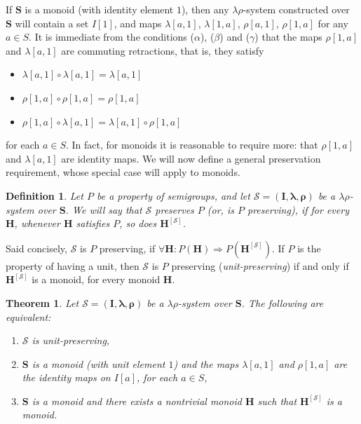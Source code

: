 \documentclass{amsart}
\newtheorem{theorem}{Theorem}
\newtheorem{definition}{Definition}
\newcommand{\blambda}{\boldsymbol{\lambda}}
\newcommand{\brho}{\boldsymbol{\rho}}
\begin{document}
If $\mathbf{S}$ is a monoid (with identity element $1$),
then any $\lambda\rho$-system
constructed over $\mathbf{S}$ will contain a set $I[1]$, and maps 
$\lambda[a,1]$, $\lambda[1,a]$, $\rho[a,1]$, $\rho[1,a]$ for any $a\in S$.
It is immediate from the conditions
($\alpha$), ($\beta$) and ($\gamma$) that 
the maps $\rho[1,a]$ and $\lambda[a,1]$ are
commuting retractions, that is, they satisfy
\begin{itemize}  
\item $\lambda[a,1]\circ\lambda[a,1] = \lambda[a,1]$
\item $\rho[1,a]\circ\rho[1,a] = \rho[1,a]$
\item $\rho[1,a]\circ\lambda[a,1]  =  \lambda[a,1]\circ\rho[1,a]$
\end{itemize}
for each $a\in S$. In fact, for monoids it is 
reasonable to require more: that $\rho[1,a]$ and $\lambda[a,1]$ are identity maps.
We will now define a general preservation 
requirement, whose special case will apply to monoids. 

\begin{definition}\label{P-preserving}
Let $P$ be a property of semigroups, and let
$\mathcal{S} = (\mathbf{I},\blambda,\brho)$ be a $\lambda\rho$-system
over $\mathbf{S}$. 
We will say that $\mathcal{S}$ \emph{preserves} $P$
\textup{(}or, \emph{is $P$ preserving}\textup{)}, if 
for every $\mathbf{H}$, whenever $\mathbf{H}$ satisfies $P$,
so does $\mathbf{H}^{[\mathcal{S}]}$. 
\end{definition}  

Said concisely, $\mathcal{S}$ is $P$ preserving, if
$\forall\mathbf{H}\colon P(\mathbf{H})\Rightarrow P(\mathbf{H}^{[\mathcal{S}]})$.
If $P$ is the property of having a unit, then 
$\mathcal{S}$ is $P$ preserving (\emph{unit-preserving})
if and only if $\mathbf{H}^{[\mathcal{S}]}$ is a monoid, for every monoid $\mathbf{H}$.

\begin{theorem}\label{main-monoid}
Let $\mathcal{S} = (\mathbf{I},\blambda,\brho)$ be a
$\lambda\rho$-system over $\mathbf{S}$. The following are equivalent:
\begin{enumerate}
\item $\mathcal{S}$ is unit-preserving,
\item $\mathbf{S}$ is a monoid \textup{(}with unit element $1$\textup{)} and the maps
$\lambda[a,1]$ and $\rho[1,a]$ are the identity maps on $I[a]$, for each $a\in S$,
\item $\mathbf{S}$ is a monoid and there exists a nontrivial monoid $\mathbf{H}$
    such that $\mathbf{H}^{[\mathcal{S}]}$  is a monoid.
\end{enumerate}
\end{theorem}
\end{document}
